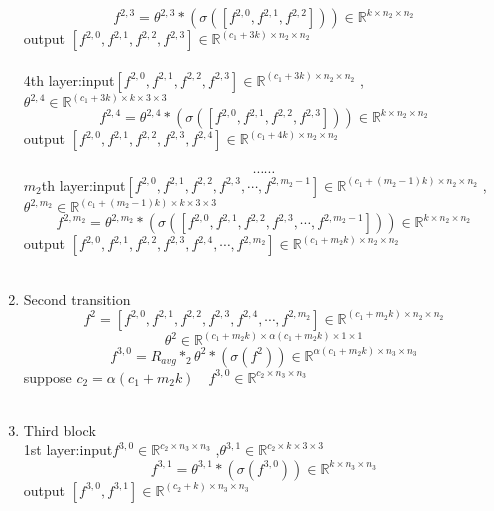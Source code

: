 \begin{enumerate}
$$ f^{2,3}=\theta^{2,3} \ast (\sigma([f^{2,0},f^{2,1},f^{2,2}]))\in \mathbb{R}^{k\times n_2\times n_2}$$
\quad\quad\quad\quad\quad output $[f^{2,0},f^{2,1}, f^{2,2},f^{2,3}] \in \mathbb{R}^{(c_1+3k)\times n_2\times n_2}$
\\ \hspace*{\fill} \\
4th layer:\quad input$[f^{2,0},f^{2,1},f^{2,2},f^{2,3}] \in \mathbb{R}^{(c_1+3k)\times n_2\times n_2}$ ,$\theta^{2,4} \in \mathbb{R}^{(c_1+3k)\times k\times3\times 3}$
$$ f^{2,4}=\theta^{2,4} \ast (\sigma([f^{2,0},f^{2,1},f^{2,2},f^{2,3}]))\in \mathbb{R}^{k\times n_2\times n_2}$$
\quad\quad\quad\quad\quad output $[f^{2,0},f^{2,1}, f^{2,2},f^{2,3},f^{2,4}] \in \mathbb{R}^{(c_1+4k)\times n_2\times n_2}$
\\ \hspace*{\fill} \\
$$\cdots\cdots$$
$m_2$th layer:\quad input$[f^{2,0},f^{2,1},f^{2,2},f^{2,3},\cdots,f^{2,m_2-1}] \in \mathbb{R}^{(c_1+(m_2-1)k)\times n_2\times n_2}$ ,$\theta^{2,m_2} \in \mathbb{R}^{(c_1+(m_2-1)k)\times k\times 3\times 3}$
$$ f^{2,m_2}=\theta^{2,m_2} \ast (\sigma([f^{2,0},f^{2,1},f^{2,2},f^{2,3},\cdots,f^{2,m_2-1}]))\in \mathbb{R}^{k\times n_2\times n_2}$$
\quad\quad\quad\quad\quad output $[f^{2,0},f^{2,1}, f^{2,2},f^{2,3},f^{2,4},\cdots,f^{2,m_2}] \in \mathbb{R}^{(c_1+m_2k)\times n_2\times n_2}$
\\ \hspace*{\fill} \\
\item Second transition
$$f^2 = [f^{2,0},f^{2,1}, f^{2,2},f^{2,3},f^{2,4},\cdots,f^{2,m_2}] \in \mathbb{R}^{(c_1+m_2k)\times n_2\times n_2}$$
$$\theta^2 \in \mathbb{R}^{(c_1+m_2k)\times \alpha(c_1+m_2k)\times 1\times 1}$$
$$f^{3,0}=R_{avg} \ast_2 \theta^{2} \ast (\sigma(f^2))\in \mathbb{R}^{\alpha(c_1+m_2k)\times n_3\times n_3}$$
suppose $c_2 = \alpha(c_1+m_2k)\quad f^{3,0}\in \mathbb{R}^{c_2\times n_3\times n_3}$
\\ \hspace*{\fill} \\
\item Third block\\
1st layer:\quad input$f^{3,0}\in \mathbb{R}^{c_2\times n_3\times n_3}$ ,$\theta^{3,1} \in \mathbb{R}^{ c_2\times k\times 3\times 3}$
$$f^{3,1}=\theta^{3,1} \ast (\sigma(f^{3,0}))\in \mathbb{R}^{k\times n_3\times n_3}$$
\quad\quad\quad\quad\quad output $[f^{3,0},f^{3,1}] \in \mathbb{R}^{(c_2+k)\times n_3\times n_3}$
\\ \hspace*{\fill} \\

\end{enumerate}
